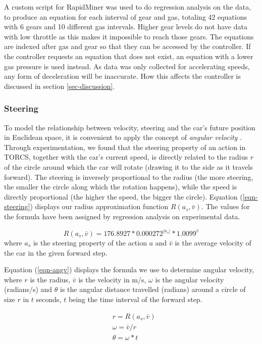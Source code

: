 \documentclass[conference]{IEEEtran}
\begin{document}
A custom script for RapidMiner \cite{rapidminer} was used to do regression analysis on the data, to produce an equation for each interval of gear and gas, totaling 42 equations with 6 gears and 10 different gas intervals. Higher gear levels do not have data with low throttle as this makes it impossible to reach those gears. The equations are indexed after gas and gear so that they can be accessed by the controller. If the controller requests an equation that does not exist, an equation with a lower gas pressure is used instead. As data was only collected for accelerating speeds, any form of deceleration will be inaccurate. How this affects the controller is discussed in section \ref{sec-discussion}.

\subsubsection{Steering}
To model the relationship between velocity, steering and the car's future position in Euclidean space, it is convenient to apply the concept of \emph{angular velocity} \cite{angv}\cite{rotq}. Through experimentation, we found that the steering property of an action in TORCS, together with the car's current speed, is directly related to the radius $r$ of the circle around which the car will rotate (drawing it to the side as it travels forward). The steering is inversely proportional to the radius (the more steering, the smaller the circle along which the rotation happens), while the speed is directly proportional (the higher the speed, the bigger the circle). Equation (\ref{eqn-steering}) displays our radius approximation function $R(a_s,\bar{v})$. The values for the formula have been assigned by regression analysis on experimental data.

\begin{equation}
\label{eqn-steering}
R(a_s,\bar{v})=176.8927*0.000272^{|a_s|}*1.0099^{\bar{v}}
\end{equation}
where $a_s$ is the steering property of the action $a$ and $\bar{v}$ is the average velocity of the car in the given forward step.

Equation (\ref{eqn-angv}) displays the formula we use to determine angular velocity, where $r$ is the radius, $\bar{v}$ is the velocity in m/s, $\omega$ is the angular velocity (radians/s) and $\theta$ is the angular distance travelled (radians) around a circle of size $r$ in $t$ seconds, $t$ being the time interval of the forward step.

\begin{equation}
\label{eqn-angv}
\begin{alignedat}{1}
& r = R(a_s,\bar{v}) \\
& \omega = \bar{v} / r \\
& \theta = \omega * t
\end{alignedat}
\end{equation}
\end{document}
